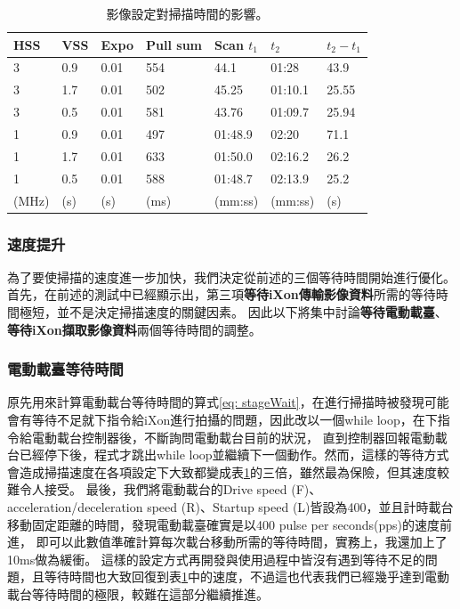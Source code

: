 \documentclass[12pt]{article}
\begin{document}
\begin{table}[]
    \centering
    \begin{tabular}{lll||llll}
        HSS   & VSS & Expo & Pull sum & Scan $t_1$ & $t_2$   & $t_2-t_1$ \\ \hline \hline
        3     & 0.9 & 0.01 & 554      & 44.1       & 01:28   & 43.9      \\ \hline
        3     & 1.7 & 0.01 & 502      & 45.25      & 01:10.1 & 25.55     \\ \hline
        3     & 0.5 & 0.01 & 581      & 43.76      & 01:09.7 & 25.94     \\ \hline
        1     & 0.9 & 0.01 & 497      & 01:48.9    & 02:20   & 71.1      \\ \hline
        1     & 1.7 & 0.01 & 633      & 01:50.0    & 02:16.2 & 26.2      \\ \hline
        1     & 0.5 & 0.01 & 588      & 01:48.7    & 02:13.9 & 25.2      \\
        (MHz) & (s) & (s)  & (ms)     & (mm:ss)    & (mm:ss) & (s)
    \end{tabular}
    \caption{影像設定對掃描時間的影響。}
    \label{tab: measuring}
\end{table}
\subsubsection{速度提升}
為了要使掃描的速度進一步加快，我們決定從前述的三個等待時間開始進行優化。首先，在前述的測試中已經顯示出，第三項\textbf{等待iXon傳輸影像資料}所需的等待時間極短，並不是決定掃描速度的關鍵因素。
因此以下將集中討論\textbf{等待電動載臺}、\textbf{等待iXon擷取影像資料}兩個等待時間的調整。
\subsubsection{電動載臺等待時間}
原先用來計算電動載台等待時間的算式\ref{eq: stageWait}，在進行掃描時被發現可能會有等待不足就下指令給iXon進行拍攝的問題，因此改以一個while loop，在下指令給電動載台控制器後，不斷詢問電動載台目前的狀況，
直到控制器回報電動載台已經停下後，程式才跳出while loop並繼續下一個動作。然而，這樣的等待方式會造成掃描速度在各項設定下大致都變成表\ref{tab: measuring}的三倍，雖然最為保險，但其速度較難令人接受。
最後，我們將電動載台的Drive speed (F)、acceleration/deceleration speed (R)、Startup speed (L)皆設為400，並且計時載台移動固定距離的時間，發現電動載臺確實是以400 pulse per seconds(pps)的速度前進，
即可以此數值準確計算每次載台移動所需的等待時間，實務上，我還加上了10ms做為緩衝。
這樣的設定方式再開發與使用過程中皆沒有遇到等待不足的問題，且等待時間也大致回復到表\ref{tab: measuring}中的速度，不過這也代表我們已經幾乎達到電動載台等待時間的極限，較難在這部分繼續推進。
\end{document}
